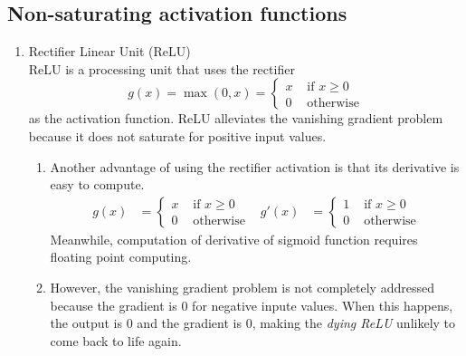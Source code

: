 \documentclass[11pt]{article}
\begin{document}
\subsection{Non-saturating activation functions}
\begin{enumerate}
    \item Rectifier Linear Unit (ReLU) \\ ReLU is a processing unit that uses the rectifier $$g(x) =  \max(0, x) = \begin{cases} x & \text{ if } x \geq 0\\ 0 & \text{ otherwise} \end{cases}$$ as the activation function. ReLU alleviates the vanishing gradient problem because it does not saturate for positive input values.
    \begin{center}
    \end{center}
    \begin{enumerate}
        \item Another advantage of using the rectifier activation is that its derivative is easy to compute.
        \begin{align*}
            g(x) &= \begin{cases} x & \text{ if } x \geq 0\\ 0 & \text{ otherwise} \end{cases}& g'(x) &=\begin{cases} 1 & \text{ if } x \geq 0\\ 0 & \text{ otherwise} \end{cases}
        \end{align*}
        Meanwhile, computation of derivative of sigmoid function requires floating point computing.
        \item However, the vanishing gradient problem is not completely addressed because the gradient is $0$ for negative inpute values. When this happens, the output is $0$ and the gradient is $0$, making the \emph{dying ReLU} unlikely to come back to life again.

\end{enumerate}
\end{enumerate}
\end{document}
